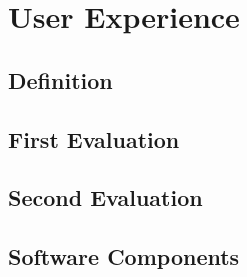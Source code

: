 \section{User Experience}


\subsection{Definition}

\subsection{First Evaluation}

\subsection{Second Evaluation}

\subsection{Software Components}